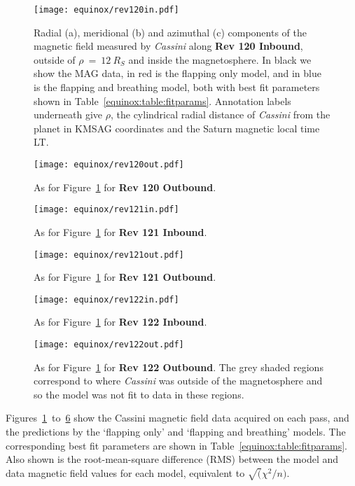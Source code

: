 \begin{figure}
\centering
\texttt{[image: equinox/rev120in.pdf]}
\caption[\textit{Cassini} MAG data, FO and F{\&}B model predictions for Rev 120 Inbound.]{Radial (a), meridional (b) and azimuthal (c) components of the magnetic field measured by \textit{Cassini} along \textbf{Rev 120 Inbound}, outside of $\rho~{=}~\SI{12}{R_S}$ and inside the magnetosphere. In black we show the MAG data, in red is the flapping only model, and in blue is the flapping and breathing model, both with best fit parameters shown in Table~\ref{equinox:table:fitparams}. Annotation labels underneath give $\rho$, the cylindrical radial distance of \textit{Cassini} from the planet in KMSAG coordinates and the Saturn magnetic local time LT.}
\label{equinox:fig:rev120in}
\end{figure}
\begin{figure}
\centering
\texttt{[image: equinox/rev120out.pdf]}
\caption[\textit{Cassini} MAG data, FO and F{\&}B model predictions for Rev 120 Outbound.]{As for Figure~\ref{equinox:fig:rev120in} for \textbf{Rev 120 Outbound}.}
\label{equinox:fig:rev120out}
\end{figure}
\begin{figure}
\centering
\texttt{[image: equinox/rev121in.pdf]}
\caption[\textit{Cassini} MAG data, FO and F{\&}B model predictions for Rev 121 Inbound.]{As for Figure~\ref{equinox:fig:rev120in} for \textbf{Rev 121 Inbound}.}
\label{equinox:fig:rev121in}
\end{figure}
\begin{figure}
\centering
\texttt{[image: equinox/rev121out.pdf]}
\caption[\textit{Cassini} MAG data, FO and F{\&}B model predictions for Rev 121 Outbound.]{As for Figure~\ref{equinox:fig:rev120in} for \textbf{Rev 121 Outbound}.}
\label{equinox:fig:rev121out}
\end{figure}
\begin{figure}
\centering
\texttt{[image: equinox/rev122in.pdf]}
\caption[\textit{Cassini} MAG data, FO and F{\&}B model predictions for Rev 122 Inbound.]{As for Figure~\ref{equinox:fig:rev120in} for \textbf{Rev 122 Inbound}.}
\label{equinox:fig:rev122in}
\end{figure}
\begin{figure}
\centering
\texttt{[image: equinox/rev122out.pdf]}
\caption[\textit{Cassini} MAG data, FO and F{\&}B model predictions for Rev 122 Outbound.]{As for Figure~\ref{equinox:fig:rev120in} for \textbf{Rev 122 Outbound}. The grey shaded regions correspond to where \textit{Cassini} was outside of the magnetosphere and so the model was not fit to data in these regions.}
\label{equinox:fig:rev122out}
\end{figure}
Figures~\ref{equinox:fig:rev120in}~to~\ref{equinox:fig:rev122out} show the Cassini magnetic field data acquired on each pass, and the predictions by the `flapping only' and `flapping and breathing' models. The corresponding best fit parameters are shown in Table~\ref{equinox:table:fitparams}. Also shown is the root-mean-square difference (RMS) between the model and data magnetic field values for each model, equivalent to $\sqrt( \chi^2/n)$.

